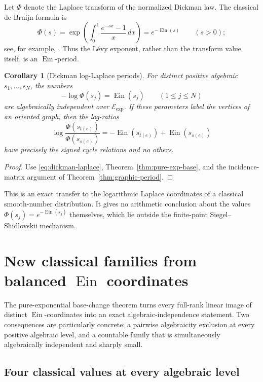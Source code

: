 \documentclass[11pt]{article}
\newtheorem{corollary}[theorem]{Corollary}
\theoremstyle{definition}
\theoremstyle{remark}
\newcommand{\Ein}{\operatorname{Ein}}
\newcommand{\Eexp}{\mathcal E_{\mathrm{exp}}}
\begin{document}
Let \(\Phi\) denote the Laplace transform of the normalized Dickman law.
The classical de Bruijn formula is
\begin{equation}\label{eq:dickman-laplace}
 \Phi(s)=\exp\left(\int_0^1\frac{e^{-sx}-1}{x}\,dx\right)
        =e^{-\Ein(s)}\qquad(s>0);
\end{equation}
see, for example, \cite{Moree2014}.  Thus the L\'evy exponent, rather than
the transform value itself, is an \(\Ein\)-period.

\begin{corollary}[Dickman log-Laplace periods]
\label{cor:dickman-matroid}
For distinct positive algebraic \(s_1,\ldots,s_N\), the numbers
\[
 -\log\Phi(s_j)=\Ein(s_j)\qquad(1\le j\le N)
\]
are algebraically independent over \(\Eexp\).  If these parameters label
the vertices of an oriented graph, then the log-ratios
\[
 \log\frac{\Phi(s_{t(e)})}{\Phi(s_{s(e)})}
 =-\Ein(s_{t(e)})+\Ein(s_{s(e)})
\]
have precisely the signed cycle relations and no others.
\end{corollary}

\begin{proof}
Use \eqref{eq:dickman-laplace}, Theorem~\ref{thm:pure-exp-base}, and the
incidence-matrix argument of Theorem~\ref{thm:graphic-period}.
\end{proof}

This is an exact transfer to the logarithmic Laplace coordinates of a
classical smooth-number distribution.  It gives no arithmetic conclusion
about the values \(\Phi(s_j)=e^{-\Ein(s_j)}\) themselves, which lie outside
the finite-point Siegel--Shidlovskii mechanism.

\section{New classical families from balanced \texorpdfstring{\(\Ein\)}{Ein} coordinates}
\label{sec:new-classical-families}

The pure-exponential base-change theorem turns every full-rank linear image
of distinct \(\Ein\)-coordinates into an exact algebraic-independence
statement.  Two consequences are particularly concrete: a pairwise
algebraicity exclusion at every positive algebraic level, and a countable
family that is simultaneously algebraically independent and sharply small.

\subsection{Four classical values at every algebraic level}
\end{document}
